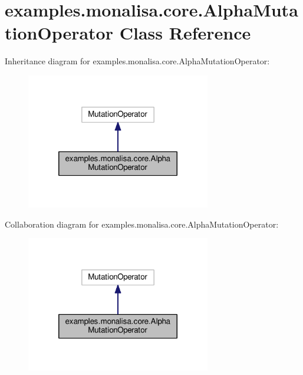 \hypertarget{classexamples_1_1monalisa_1_1core_1_1_alpha_mutation_operator}{\section{examples.\-monalisa.\-core.\-Alpha\-Mutation\-Operator Class Reference}
\label{classexamples_1_1monalisa_1_1core_1_1_alpha_mutation_operator}
}


Inheritance diagram for examples.\-monalisa.\-core.\-Alpha\-Mutation\-Operator\-:
\nopagebreak
\begin{figure}[H]
\begin{center}
\leavevmode
\includegraphics[width=228pt]{classexamples_1_1monalisa_1_1core_1_1_alpha_mutation_operator__inherit__graph}
\end{center}
\end{figure}


Collaboration diagram for examples.\-monalisa.\-core.\-Alpha\-Mutation\-Operator\-:
\nopagebreak
\begin{figure}[H]
\begin{center}
\leavevmode
\includegraphics[width=228pt]{classexamples_1_1monalisa_1_1core_1_1_alpha_mutation_operator__coll__graph}
\end{center}
\end{figure}
